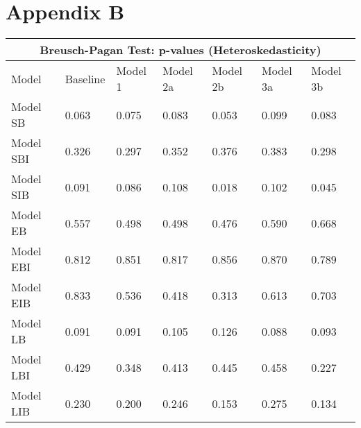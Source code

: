 %
%

\chapter{Appendix B}
\label{app:app02}

\begin{table}[!h]
\begin{tabular}{lllllll}
\hline
\multicolumn{7}{c}{Breusch-Pagan Test: p-values (Heteroskedasticity)}      \\ \hline
Model     & Baseline & Model 1 & Model 2a & Model 2b & Model 3a & Model 3b \\ \hline
Model SB  & 0.063    & 0.075   & 0.083    & 0.053    & 0.099    & 0.083    \\
Model SBI & 0.326    & 0.297   & 0.352    & 0.376    & 0.383    & 0.298    \\
Model SIB & 0.091    & 0.086   & 0.108    & 0.018    & 0.102    & 0.045    \\
Model EB  & 0.557    & 0.498   & 0.498    & 0.476    & 0.590    & 0.668    \\
Model EBI & 0.812    & 0.851   & 0.817    & 0.856    & 0.870    & 0.789    \\
Model EIB & 0.833    & 0.536   & 0.418    & 0.313    & 0.613    & 0.703    \\
Model LB  & 0.091    & 0.091   & 0.105    & 0.126    & 0.088    & 0.093    \\
Model LBI & 0.429    & 0.348   & 0.413    & 0.445    & 0.458    & 0.227    \\
Model LIB & 0.230    & 0.200   & 0.246    & 0.153    & 0.275    & 0.134   
\end{tabular}
\end{table}